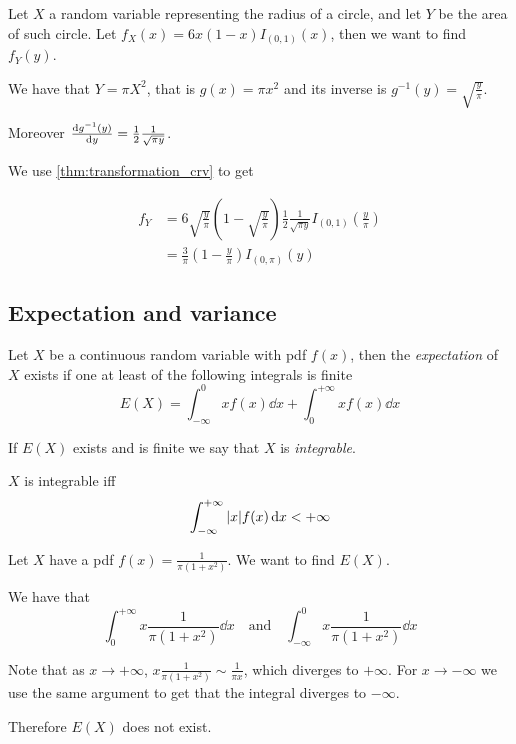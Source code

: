 \documentclass[12pt]{extarticle}
\begin{document}
\begin{example}
    Let $X$ a random variable representing the radius of a circle, and let $Y$ be the area of such circle.
    Let $f_X(x) = 6x(1-x)I_{(0,1)}(x)$, then we want to find $f_Y(y)$.

    We have that $Y = \pi X^2$, that is $g(x) = \pi x^2$ and its inverse is $g^{-1}(y) = \sqrt{\frac{y}{\pi}}$.

    Moreover $\dv{g^{-1}(y)}{y} = \frac{1}{2} \frac{1}{\sqrt{\pi y}}$.

    We use \autoref{thm:transformation_crv} to get

    \begin{align}
        f_Y & = 6\sqrt{\frac{y}{\pi}} \left(1- \sqrt{\frac{y}{\pi}}\right) \frac{1}{2} \frac{1}{\sqrt{\pi y}} I_{(0, 1)}\left(\frac{y}{\pi}\right) \\
            & = \frac{3}{\pi} \left(1- \frac{y}{\pi}\right) I_{(0, \pi)}(y)
    \end{align}

\end{example}

\subsection{Expectation and variance}

\begin{definition}[expectation]
    Let $X$ be a continuous random variable with pdf $f(x)$, then the \emph{expectation} of $X$ exists if one at least of the following integrals is finite
    \begin{equation}
        E(X) = \int_{-\infty}^{0} x f(x) \dd{x} + \int_{0}^{+\infty} x f(x) \dd{x}
    \end{equation}

    If $E(X)$ exists and is finite we say that $X$ is \emph{integrable}.
\end{definition}

\begin{lemma}
    $X$ is integrable iff
    \begin{equation}
        \int_{-\infty}^{+\infty} \abs{x} f(x) \dd{x} < +\infty
    \end{equation}
\end{lemma}

\begin{example}
    Let $X$ have a pdf $f(x) = \frac{1}{\pi (1+x^2)}$.
    We want to find $E(X)$.

    We have that
    \begin{equation}
        \int_0^{+\infty} x \frac{1}{\pi (1+x^2)} \dd{x} \quad \text{and} \quad \int_{-\infty}^0 x \frac{1}{\pi (1+x^2)} \dd{x}
    \end{equation}

    Note that as $x \to +\infty$, $x \frac{1}{\pi (1+x^2)} \sim \frac{1}{\pi x}$, which diverges to $+\infty$.
    For $x \to -\infty$ we use the same argument to get that the integral diverges to $-\infty$.

    Therefore $E(X)$ does not exist.
\end{example}
\end{document}
